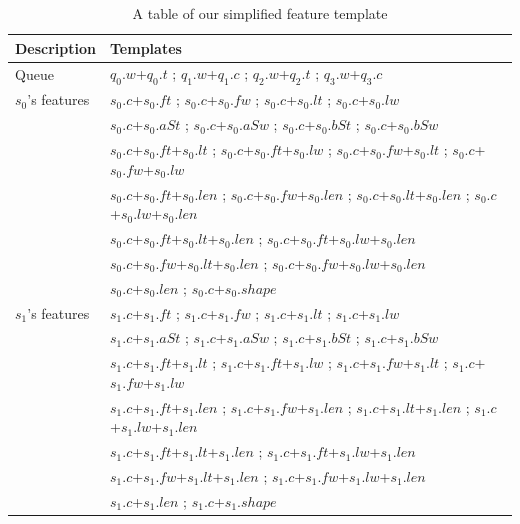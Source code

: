 \begin{table}[t]
	\caption{\label{simplified feat} A table of our simplified feature template}
	\begin{center}
		\begin{tabular}{|l|l|}
			\hline 
			Description & Templates  \\ 
			\hline
			Queue	 	& $q_0.w$+$q_0.t$   ;   $q_1.w$+$q_1.c$   ;   $q_2.w$+$q_2.t$   ;   $q_3.w$+$q_3.c$ \\
			\hline
			$s_0$'s features	 	& $s_0.c$+$s_0.ft$	 ;   $s_0.c$+$s_0.fw$   ;   $s_0.c$+$s_0.lt$   ;   $s_0.c$+$s_0.lw$ \\
			& $s_0.c$+$s_0.aSt$   ;   $s_0.c$+$s_0.aSw$   ;   $s_0.c$+$s_0.bSt$   ;   $s_0.c$+$s_0.bSw$ \\
		    & $s_0.c$+$s_0.ft$+$s_0.lt$   ;   $s_0.c$+$s_0.ft$+$s_0.lw$   ;   $s_0.c$+$s_0.fw$+$s_0.lt$   ;   $s_0.c$+$s_0.fw$+$s_0.lw$ \\
		    & $s_0.c$+$s_0.ft$+$s_0.len$   ;   $s_0.c$+$s_0.fw$+$s_0.len$   ;   $s_0.c$+$s_0.lt$+$s_0.len$   ;   $s_0.c$+$s_0.lw$+$s_0.len$ \\
		    & $s_0.c$+$s_0.ft$+$s_0.lt$+$s_0.len$   ;   $s_0.c$+$s_0.ft$+$s_0.lw$+$s_0.len$ \\
		    & $s_0.c$+$s_0.fw$+$s_0.lt$+$s_0.len$   ;	$s_0.c$+$s_0.fw$+$s_0.lw$+$s_0.len$ \\
			& $s_0.c$+$s_0.len$  ;   $s_0.c$+$s_0.shape$\\
			\hline
			$s_1$'s	features 	& $s_1.c$+$s_1.ft$	 ;   $s_1.c$+$s_1.fw$   ;   $s_1.c$+$s_1.lt$   ;   $s_1.c$+$s_1.lw$ \\
			& $s_1.c$+$s_1.aSt$   ;   $s_1.c$+$s_1.aSw$   ;   $s_1.c$+$s_1.bSt$   ;   $s_1.c$+$s_1.bSw$ \\
			& $s_1.c$+$s_1.ft$+$s_1.lt$   ;   $s_1.c$+$s_1.ft$+$s_1.lw$   ;   $s_1.c$+$s_1.fw$+$s_1.lt$   ;   $s_1.c$+$s_1.fw$+$s_1.lw$ \\
			& $s_1.c$+$s_1.ft$+$s_1.len$   ;   $s_1.c$+$s_1.fw$+$s_1.len$   ;   $s_1.c$+$s_1.lt$+$s_1.len$   ;   $s_1.c$+$s_1.lw$+$s_1.len$ \\
			& $s_1.c$+$s_1.ft$+$s_1.lt$+$s_1.len$   ;   $s_1.c$+$s_1.ft$+$s_1.lw$+$s_1.len$ \\
			& $s_1.c$+$s_1.fw$+$s_1.lt$+$s_1.len$   ;	$s_1.c$+$s_1.fw$+$s_1.lw$+$s_1.len$ \\
			& $s_1.c$+$s_1.len$  ;   $s_1.c$+$s_1.shape$\\
			\hline
		\end{tabular}
	\end{center}
\end{table}